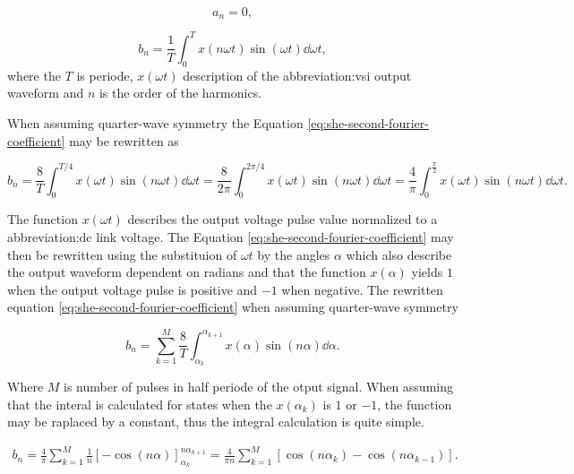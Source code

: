 \documentclass[a4paper, twoside, 11pt]{article}
\begin{document}
            \begin{equation}
                a_n = 0,
                \label{eq:she-first-fourier-coefficient-zero}
            \end{equation}

            \begin{equation}
                b_n = \frac{1}{T} \int_{0}^{T} x(n\omega t)\sin(\omega t) \dd \omega t,
                \label{eq:she-second-fourier-coefficient}
            \end{equation}
            where the $T$ is periode, $x(\omega t)$ description of the \gls{abbreviation:vsi} output waveform and $n$ is the order of the harmonics.

            When assuming quarter-wave symmetry the Equation \ref{eq:she-second-fourier-coefficient} may be rewritten as

            \begin{equation}
                b_n = \frac{8}{T} \int_{0}^{T/4} x(\omega t) \sin (n\omega t) \dd \omega t = \frac{8}{2 \pi} \int_{0}^{2 \pi/4} x(\omega t) \sin (n\omega t) \dd \omega t = \frac{4}{\pi} \int_{0}^{\frac{\pi}{2}} x(\omega t) \sin (n\omega t) \dd \omega t.
            \end{equation}

            The function $x(\omega t)$ describes the output voltage pulse value normalized to a \gls{abbreviation:dc} link voltage. The Equation \ref{eq:she-second-fourier-coefficient} may then be rewritten using the substituion of $\omega t$ by the angles $\alpha$ which also describe the output waveform dependent on radians and that the function $x(\alpha)$ yields $1$ when the output voltage pulse is positive and $-1$ when negative. The rewritten equation \ref{eq:she-second-fourier-coefficient} when assuming quarter-wave symmetry

            \begin{equation}
                b_n = \sum_{k=1}^{M} \frac{8}{T} \int_{\alpha_k}^{\alpha_{k+1}} x(\alpha) \sin(n\alpha) \dd \alpha.
            \end{equation}

           Where $M$ is number of pulses in half periode of the otput signal. When assuming that the interal is calculated for states when the $x(\alpha_k)$ is $1$ or $-1$, the function may be raplaced by a constant, thus the integral calculation is quite simple.

           \begin{equation}
               \begin{gathered}
                    b_n = \frac{4}{\pi} \sum_{k=1}^{M} \frac{1}{n} \left[ - \cos(n\alpha) \right]_{\alpha_k}^{n\alpha_{k+1}}
                    = \frac{4}{\pi n} \sum_{k=1}^{M} \left[ \cos(n\alpha_k) - \cos(n\alpha_{k-1}) \right].
               \end{gathered}
               \label{eq:she-equation-integration}
           \end{equation}
\end{document}
